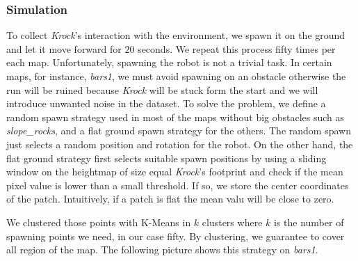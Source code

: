 \documentclass[../document.tex]{subfiles}
\begin{document}
\subsubsection{Simulation}
To collect \emph{Krock}'s interaction with the environment, we spawn it on the ground and let it move forward for $20$ seconds. We repeat this process fifty times per each map.
    Unfortunately, spawning the robot is not a trivial task. In certain maps, for instance, \emph{bars1}, we must avoid spawning on an obstacle otherwise the run will be ruined because \emph{Krock} will be stuck form the start and we will introduce unwanted noise in the dataset. To solve the problem, we define a random spawn strategy used in most of the maps without big obstacles such as \emph{slope\_rocks}, and a flat ground spawn strategy for the others. The random spawn just selects a random position and rotation for the robot. On the other hand, the flat ground strategy first selects suitable spawn positions by using a sliding window on the heightmap of size equal \emph{Krock}'s footprint and check if the mean pixel value is lower than a small threshold. If so, we store the center coordinates of the patch. Intuitively, if a patch is flat the mean valu will be close to zero.
    
We clustered those points with K-Means in $k$ clusters where $k$ is the number of spawning points we need, in our case fifty. By clustering, we guarantee to cover all region of the map. The following picture shows this strategy on \emph{bars1}.
\end{document}

